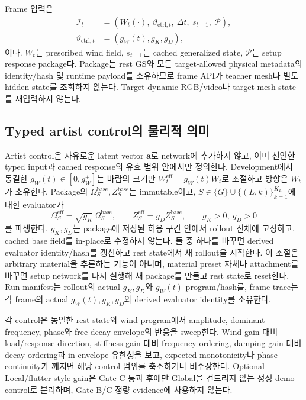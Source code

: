 \documentclass[11pt]{article}
\begin{document}
Frame 입력은
\begin{equation}
  \begin{aligned}
  \mathcal I_t&=\left(W_t(\cdot),\ \vartheta_{\mathrm{ctrl},t},\ \Delta t,\ s_{t-1},\ \mathcal P\right),\\
  \vartheta_{\mathrm{ctrl},t}&=\left(g_W(t),g_K,g_D\right),
  \end{aligned}
  \label{eq:rd-frame-input}
\end{equation}
이다. \(W_t\)는 prescribed wind field, \(s_{t-1}\)는 cached generalized state,
\(\mathcal P\)는 setup response package다. Package는 rest GS와 모든 target-allowed physical metadata의
identity/hash 및 runtime payload를 소유하므로 frame API가 teacher mesh나 별도 hidden state를 조회하지 않는다.
Target dynamic RGB/video나 target mesh state를 재입력하지 않는다.

\subsection{Typed artist control의 물리적 의미}

Artist control은 자유로운 latent vector \(\mathbf a\)로 network에 추가하지 않고,
이미 선언한 typed input과 cached response의 유효 범위 안에서만 정의한다.
Development에서 동결한 \(g_W(t)\in[0,g_W^+]\)는 바람의 크기만
\(W_t^{\mathrm{eff}}=g_W(t)W_t\)로 조절하고 방향은 \(W_t\)가 소유한다. Package의
\(\Omega_S^{\mathrm{base}},Z_S^{\mathrm{base}}\)는 immutable이고,
\(S\in\{G\}\cup\{(L,k)\}_{k=1}^{K_L}\)에 대한 evaluator가
\begin{equation}
  \Omega_S^{\mathrm{eff}}=\sqrt{g_K}\,\Omega_S^{\mathrm{base}},
  \qquad
  Z_S^{\mathrm{eff}}=g_DZ_S^{\mathrm{base}},
  \qquad g_K>0,\ g_D>0
  \label{eq:rd-typed-control-map}
\end{equation}
를 파생한다. \(g_K,g_D\)는 package에 저장된 허용 구간 안에서 rollout 전체에 고정하고,
cached base field를 in-place로 수정하지 않는다. 둘 중 하나를 바꾸면 derived evaluator identity/hash를
갱신하고 rest state에서 새 rollout을 시작한다. 이 조절은 arbitrary material을 추론하는 기능이
아니며, material preset 자체나 attachment를 바꾸면 setup network를 다시 실행해 새 package를
만들고 rest state로 reset한다. Run manifest는 rollout의 actual \(g_K,g_D\)와 \(g_W(t)\)
program/hash를, frame trace는 각 frame의 actual \(g_W(t),g_K,g_D\)와 derived evaluator identity를 소유한다.

각 control은 동일한 rest state와 wind program에서 amplitude, dominant frequency, phase와
free-decay envelope의 반응을 sweep한다. Wind gain 대비 load/response direction, stiffness gain 대비
frequency ordering, damping gain 대비 decay ordering과 in-envelope 유한성을 보고, expected monotonicity나
phase continuity가 깨지면 해당 control 범위를 축소하거나 비주장한다. Optional Local/flutter style
gain은 Gate C 통과 후에만 Global을 건드리지 않는 정성 demo control로 분리하며,
Gate B/C 정량 evidence에 사용하지 않는다.
\end{document}

